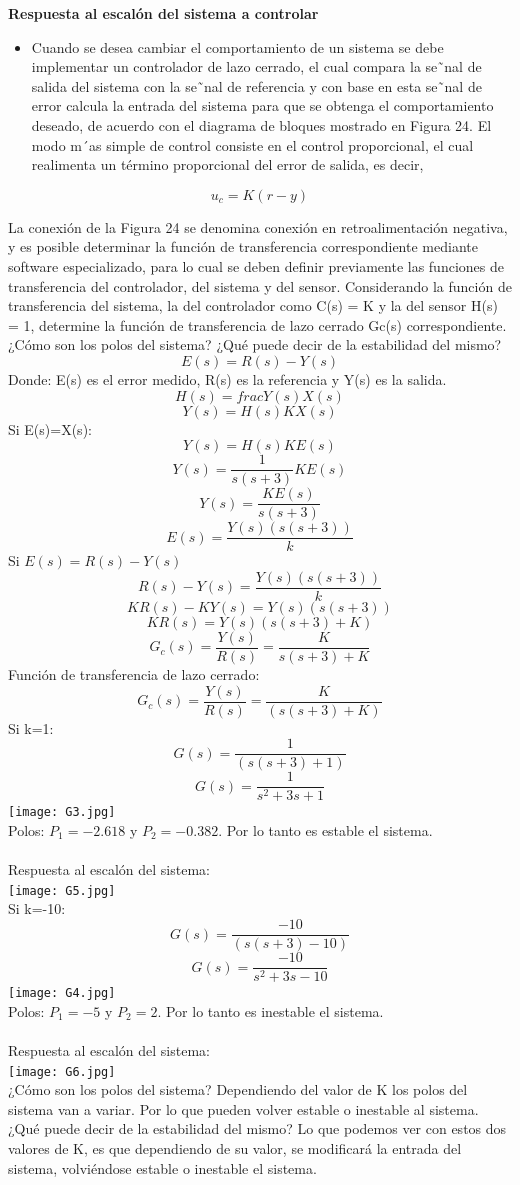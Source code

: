 \textbf{Respuesta al escalón del sistema a controlar}

\begin{itemize}
	\item Cuando se desea cambiar el comportamiento de un sistema se debe implementar un controlador de lazo
	cerrado, el cual compara la se˜nal de salida del sistema con la se˜nal de referencia y con base en esta se˜nal
	de error calcula la entrada del sistema para que se obtenga el comportamiento deseado, de acuerdo con
	el diagrama de bloques mostrado en Figura 24. El modo m´as simple de control consiste en el control
	proporcional, el cual realimenta un término proporcional del error de salida, es decir,
\end{itemize}

\begin{equation*}
	u_c=K(r-y)
\end{equation*}

La conexión de la Figura 24 se denomina conexión en retroalimentación negativa, y es posible determinar la función de transferencia correspondiente mediante software especializado, para lo cual se deben definir
previamente las funciones de transferencia del controlador, del sistema y del sensor. Considerando la función de transferencia del sistema, la del controlador como C(s) = K y la del sensor H(s) = 1, determine
la función de transferencia de lazo cerrado Gc(s) correspondiente. ¿Cómo son los polos del sistema? ¿Qué puede decir de la estabilidad del mismo?
$$E(s)=R(s)-Y(s)$$
Donde: E(s) es el error medido, R(s) es la referencia y Y(s) es la salida.
$$H(s)=frac{Y(s)}{X(s)}$$
$$Y(s)=H(s)KX(s)$$
Si E(s)=X(s):
$$Y(s)=H(s)KE(s)$$
$$Y(s)=\frac{1}{s(s+3)}KE(s)$$
$$Y(s)=\frac{KE(s)}{s(s+3)}$$
$$E(s)=\frac{Y(s)(s(s+3))}{k}$$
Si $E(s)=R(s)-Y(s)$
$$R(s)-Y(s)=\frac{Y(s)(s(s+3))}{k}$$
$$KR(s)-KY(s)=Y(s)(s(s+3))$$
$$KR(s)=Y(s)(s(s+3)+K)$$
$$G_{c}(s)=\frac{Y(s)}{R(s)}=\frac{K}{s(s+3)+K}$$
Función de transferencia de lazo cerrado:
$$G_{c}(s)=\frac{Y(s)}{R(s)}=\frac{K}{(s(s+3)+K)}$$	
Si k=1:
$$G(s)=\frac{1}{(s(s+3)+1)}$$	
$$G(s)=\frac{1}{s^{2}+3s+1}$$	
\texttt{[image: G3.jpg]}\\ 
Polos: $P_{1}=-2.618$ y $P_{2}=-0.382$. Por lo tanto es estable el sistema.\\\\
Respuesta al escalón del sistema:\\
\texttt{[image: G5.jpg]}\\
Si k=-10:
$$G(s)=\frac{-10}{(s(s+3)-10)}$$	
$$G(s)=\frac{-10}{s^{2}+3s-10}$$
\texttt{[image: G4.jpg]}\\ 	
Polos: $P_{1}=-5$ y $P_{2}=2$. Por lo tanto es inestable el sistema.\\\\
Respuesta al escalón del sistema:\\
\texttt{[image: G6.jpg]}\\
¿Cómo son los polos del sistema? Dependiendo del valor de K los polos del sistema van a variar. Por lo que pueden volver estable o inestable al sistema.\\
¿Qué puede decir de la estabilidad del mismo? Lo que podemos ver con estos dos valores de K, es que dependiendo de su valor, se modificará la entrada del sistema, volviéndose estable o inestable el sistema.

